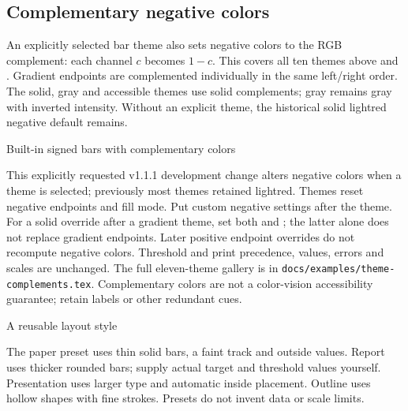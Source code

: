 \subsection{Complementary negative colors}
An explicitly selected bar theme also sets negative colors to the RGB complement:
each channel $c$ becomes $1-c$. This covers all ten themes above and
. Gradient endpoints are complemented individually in the
same left/right order. The solid, gray and accessible themes use solid
complements; gray remains gray with inverted intensity. Without an explicit
theme, the historical solid lightred negative default remains.
\begin{demo}{Built-in signed bars with complementary colors}



\end{demo}
This explicitly requested v1.1.1 development change alters negative colors when a
theme is selected; previously most themes retained lightred. Themes reset negative
endpoints and fill mode. Put custom negative settings after the theme. For a solid
override after a gradient theme, set both  and
; the latter alone does not replace gradient endpoints.
Later positive endpoint overrides do not recompute negative colors.
Threshold and print precedence, values, errors and scales are unchanged.
The full eleven-theme gallery is in \texttt{docs/examples/theme-complements.tex}.
Complementary colors are not a color-vision accessibility guarantee; retain labels
or other redundant cues.

\begin{demo}{A reusable layout style}




\end{demo}
The paper preset uses thin solid bars, a faint track and outside values. Report
uses thicker rounded bars; supply actual target and threshold values yourself.
Presentation uses larger type and automatic inside placement. Outline uses hollow
shapes with fine strokes. Presets do not invent data or scale limits.

